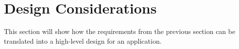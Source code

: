 
\section{Design Considerations}

This section will show how the requirements from the previous section can be translated into a high-level design for an application.




